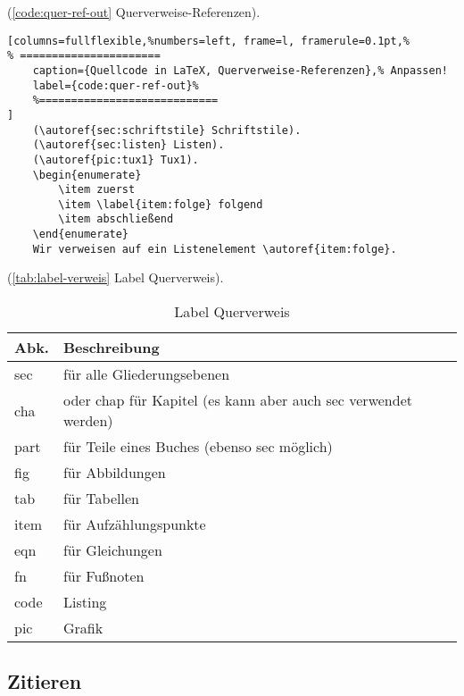 (\autoref{code:quer-ref-out} Querverweise-Referenzen).%
\lstset{language=[LaTeX]TeX} %
\begin{lstlisting}[columns=fullflexible,%numbers=left, frame=l, framerule=0.1pt,%
% ======================
	caption={Quellcode in LaTeX, Querverweise-Referenzen},% Anpassen!
	label={code:quer-ref-out}%
	%============================
]
	(\autoref{sec:schriftstile} Schriftstile).
	(\autoref{sec:listen} Listen).
	(\autoref{pic:tux1} Tux1).
	\begin{enumerate}
		\item zuerst
		\item \label{item:folge} folgend
		\item abschließend
	\end{enumerate}
	Wir verweisen auf ein Listenelement \autoref{item:folge}.
\end{lstlisting}

(\autoref{tab:label-verweis} Label Querverweis).
\begin{table}[!hb] %
	\caption{Label Querverweis }	%
  \label{tab:label-verweis}	%
	\centering
	\begin{tabular} {ll}
	\toprule %
		Abk. & Beschreibung \\
  \midrule
		sec  & für alle Gliederungsebenen \\
		cha  & oder chap für Kapitel (es kann aber auch sec verwendet werden) \\
		part & für Teile eines Buches (ebenso sec möglich) \\
		fig  & für Abbildungen \\
		tab  & für Tabellen \\
		item & für Aufzählungspunkte \\
		eqn  & für Gleichungen  \\
		fn   & für Fußnoten \\
		code & Listing \\
		pic  & Grafik \\
	\bottomrule
	\end{tabular}
\end{table}

\newpage

\subsection{Zitieren}\label{sec:zitieren}

